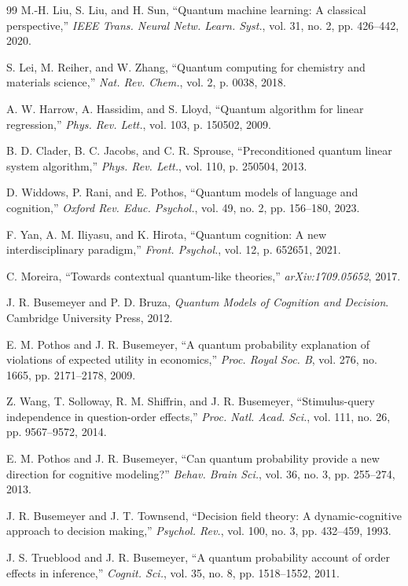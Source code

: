 \documentclass[conference]{IEEEtran}
\begin{document}
\begin{thebibliography}{99}
 M.-H. Liu, S. Liu, and H. Sun, ``Quantum machine learning: A classical perspective,'' \textit{IEEE Trans. Neural Netw. Learn. Syst.}, vol. 31, no. 2, pp. 426--442, 2020.

 S. Lei, M. Reiher, and W. Zhang, ``Quantum computing for chemistry and materials science,'' \textit{Nat. Rev. Chem.}, vol. 2, p. 0038, 2018.

 A. W. Harrow, A. Hassidim, and S. Lloyd, ``Quantum algorithm for linear regression,'' \textit{Phys. Rev. Lett.}, vol. 103, p. 150502, 2009.

 B. D. Clader, B. C. Jacobs, and C. R. Sprouse, ``Preconditioned quantum linear system algorithm,'' \textit{Phys. Rev. Lett.}, vol. 110, p. 250504, 2013.

 D. Widdows, P. Rani, and E. Pothos, ``Quantum models of language and cognition,'' \textit{Oxford Rev. Educ. Psychol.}, vol. 49, no. 2, pp. 156--180, 2023.

 F. Yan, A. M. Iliyasu, and K. Hirota, ``Quantum cognition: A new interdisciplinary paradigm,'' \textit{Front. Psychol.}, vol. 12, p. 652651, 2021.

 C. Moreira, ``Towards contextual quantum-like theories,'' \textit{arXiv:1709.05652}, 2017.

 J. R. Busemeyer and P. D. Bruza, \textit{Quantum Models of Cognition and Decision}. Cambridge University Press, 2012.

 E. M. Pothos and J. R. Busemeyer, ``A quantum probability explanation of violations of expected utility in economics,'' \textit{Proc. Royal Soc. B}, vol. 276, no. 1665, pp. 2171--2178, 2009.

 Z. Wang, T. Solloway, R. M. Shiffrin, and J. R. Busemeyer, ``Stimulus-query independence in question-order effects,'' \textit{Proc. Natl. Acad. Sci.}, vol. 111, no. 26, pp. 9567--9572, 2014.

 E. M. Pothos and J. R. Busemeyer, ``Can quantum probability provide a new direction for cognitive modeling?'' \textit{Behav. Brain Sci.}, vol. 36, no. 3, pp. 255--274, 2013.

 J. R. Busemeyer and J. T. Townsend, ``Decision field theory: A dynamic-cognitive approach to decision making,'' \textit{Psychol. Rev.}, vol. 100, no. 3, pp. 432--459, 1993.

 J. S. Trueblood and J. R. Busemeyer, ``A quantum probability account of order effects in inference,'' \textit{Cognit. Sci.}, vol. 35, no. 8, pp. 1518--1552, 2011.


\end{thebibliography}
\end{document}

